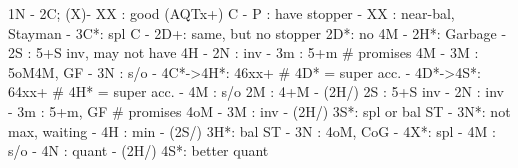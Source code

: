 1N - 2C;
(X)- XX : good (AQTx+) C
   - P  : have stopper
        - XX : near-bal, Stayman
        - 3C*: spl C
   - 2D+: same, but no stopper
2D*: no 4M
   - 2H*: Garbage
   - 2S : 5+S inv, may not have 4H
   - 2N : inv
   - 3m : 5+m  # promises 4M
   - 3M : 5oM4M, GF
   - 3N : s/o
   - 4C*->4H*: 46xx+  # 4D* = super acc.
   - 4D*->4S*: 64xx+  # 4H* = super acc.
   - 4M : s/o
2M : 4+M
   - (2H/) 2S : 5+S inv
   - 2N : inv
   - 3m : 5+m, GF  # promises 4oM
   - 3M : inv
   - (2H/) 3S*: spl or bal ST
              - 3N*: not max, waiting
              - 4H : min
   - (2S/) 3H*: bal ST
   - 3N : 4oM, CoG
   - 4X*: spl
   - 4M : s/o
   - 4N : quant
   - (2H/) 4S*: better quant